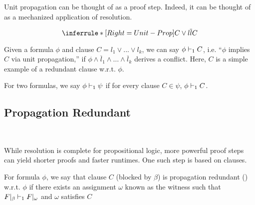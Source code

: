 Unit propagation can be thought of as a proof step. Indeed, it can be thought of as a mechanized application of resolution.

\begin{equation*}
    \inferrule*[Right=Unit-Prop]{
        C \lor l \\ \overline{l}
    }{
        C
    }
\end{equation*}

Given a formula $\phi$ and clause $C = l_1 \lor ... \lor l_k$, we can say $\phi \vdash_1 C$, i.e. ``$\phi$ implies $C$ via unit propagation,'' if $\phi \land \overline{l}_1 \land \dots \land \overline{l}_k$ derives a conflict. Here, $C$ is a simple example of a redundant clause w.r.t. $\phi$. 








For two formulas, we say $\phi \vdash_1 \psi$ if for every clause $C \in \psi$, $\phi \vdash_1 C$. 


\subsection{Propagation Redundant}~\label{subsec:pr}

While resolution is complete for propositional logic, more powerful proof steps can yield shorter proofs and faster runtimes. One such step is based on \pr clauses.

\begin{definition}
    For formula $\phi$, we say that clause $C$ (blocked by $\beta$) is propagation redundant (\pr) w.r.t. $\phi$ if there exists an assignment $\omega$ known as the witness such that $F|_\beta \vdash_1 F|_\omega$ and $\omega$ satisfies $C$
\end{definition}

